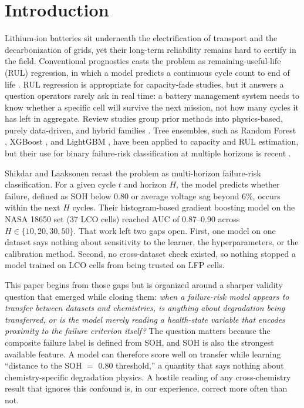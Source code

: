 \documentclass[IJPHM, 2014, 00]{PHMSociety}
\begin{document}
\section{Introduction}
Lithium-ion batteries sit underneath the electrification of transport and the decarbonization of grids, yet their long-term reliability remains hard to certify in the field. Conventional prognostics casts the problem as remaining-useful-life (RUL) regression, in which a model predicts a continuous cycle count to end of life \cite{meng2019review}. RUL regression is appropriate for capacity-fade studies, but it answers a question operators rarely ask in real time: a battery management system needs to know whether a specific cell will survive the next mission, not how many cycles it has left in aggregate. Review studies group prior methods into physics-based, purely data-driven, and hybrid families \cite{meng2019review}. Tree ensembles, such as Random Forest \cite{breiman2001random}, XGBoost \cite{chen2016xgboost}, and LightGBM \cite{ke2017lightgbm}, have been applied to capacity and RUL estimation, but their use for binary failure-risk classification at multiple horizons is recent \cite{shikdar2026learning}.

Shikdar and Laaksonen \citeyear{shikdar2026learning} recast the problem as multi-horizon failure-risk classification. For a given cycle $t$ and horizon $H$, the model predicts whether failure, defined as SOH below 0.80 or average voltage sag beyond 6\%, occurs within the next $H$ cycles. Their histogram-based gradient boosting model on the NASA 18650 set (37 LCO cells) reached AUC of 0.87--0.90 across $H \in \{10,20,30,50\}$. That work left two gaps open. First, one model on one dataset says nothing about sensitivity to the learner, the hyperparameters, or the calibration method. Second, no cross-dataset check existed, so nothing stopped a model trained on LCO cells from being trusted on LFP cells.

This paper begins from those gaps but is organized around a sharper validity question that emerged while closing them: \emph{when a failure-risk model appears to transfer between datasets and chemistries, is anything about degradation being transferred, or is the model merely reading a health-state variable that encodes proximity to the failure criterion itself?} The question matters because the composite failure label is defined from SOH, and SOH is also the strongest available feature. A model can therefore score well on transfer while learning ``distance to the SOH $=$ 0.80 threshold,'' a quantity that says nothing about chemistry-specific degradation physics. A hostile reading of any cross-chemistry result that ignores this confound is, in our experience, correct more often than not.
\end{document}

